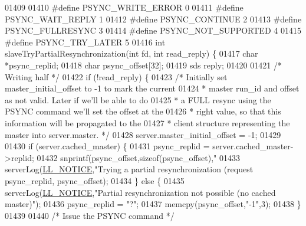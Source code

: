 \begin{DoxyCode}
{{{{{{{{{{{{{{{{{{{{{{{{{{{{{{{{{{{{{{{{{{{{{{{{{{01409 
01410 \textcolor{preprocessor}{#}\textcolor{preprocessor}{define} \textcolor{preprocessor}{PSYNC\_WRITE\_ERROR} 0
01411 \textcolor{preprocessor}{#}\textcolor{preprocessor}{define} \textcolor{preprocessor}{PSYNC\_WAIT\_REPLY} 1
01412 \textcolor{preprocessor}{#}\textcolor{preprocessor}{define} \textcolor{preprocessor}{PSYNC\_CONTINUE} 2
01413 \textcolor{preprocessor}{#}\textcolor{preprocessor}{define} \textcolor{preprocessor}{PSYNC\_FULLRESYNC} 3
01414 \textcolor{preprocessor}{#}\textcolor{preprocessor}{define} \textcolor{preprocessor}{PSYNC\_NOT\_SUPPORTED} 4
01415 \textcolor{preprocessor}{#}\textcolor{preprocessor}{define} \textcolor{preprocessor}{PSYNC\_TRY\_LATER} 5
01416 \textcolor{keywordtype}{int} slaveTryPartialResynchronization(\textcolor{keywordtype}{int} fd, \textcolor{keywordtype}{int} read\_reply) \{
01417     \textcolor{keywordtype}{char} *psync\_replid;
01418     \textcolor{keywordtype}{char} psync\_offset[32];
01419     sds reply;
01420 
01421     \textcolor{comment}{/* Writing half */}
01422     \textcolor{keywordflow}{if} (!read\_reply) \{
01423         \textcolor{comment}{/* Initially set master\_initial\_offset to -1 to mark the current}
01424 \textcolor{comment}{         * master run\_id and offset as not valid. Later if we'll be able to do}
01425 \textcolor{comment}{         * a FULL resync using the PSYNC command we'll set the offset at the}
01426 \textcolor{comment}{         * right value, so that this information will be propagated to the}
01427 \textcolor{comment}{         * client structure representing the master into server.master. */}
01428         server.master\_initial\_offset = -1;
01429 
01430         \textcolor{keywordflow}{if} (server.cached\_master) \{
01431             psync\_replid = server.cached\_master->replid;
01432             snprintf(psync\_offset,\textcolor{keyword}{sizeof}(psync\_offset),\textcolor{stringliteral}{"%
01433             serverLog(\hyperlink{server_8h_a8c54c191e436c7dd3012167212692401}{LL\_NOTICE},\textcolor{stringliteral}{"Trying a partial resynchronization (request %
      psync\_replid, psync\_offset);
01434         \} \textcolor{keywordflow}{else} \{
01435             serverLog(\hyperlink{server_8h_a8c54c191e436c7dd3012167212692401}{LL\_NOTICE},\textcolor{stringliteral}{"Partial resynchronization not possible (no cached master)"});
01436             psync\_replid = \textcolor{stringliteral}{"?"};
01437             memcpy(psync\_offset,\textcolor{stringliteral}{"-1"},3);
01438         \}
01439 
01440         \textcolor{comment}{/* Issue the PSYNC command */}
}}}}}}}}}}}}}}}}}}}}}}}}}}}}}}}}}}}}}}}}}}}}}}}}}}}}
\end{DoxyCode}
